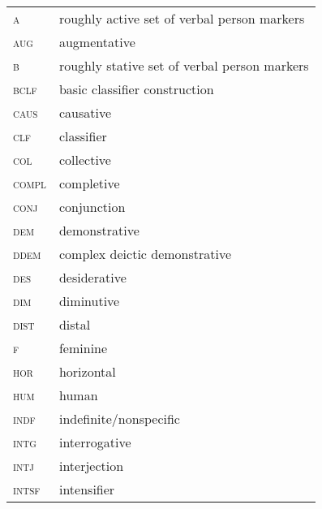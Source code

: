 \documentclass[output=paper,colorlinks,citecolor=brown]{langscibook}
\begin{document}
\begin{tabularx}{.45\textwidth}{lQ}
\textsc{a} & roughly active set of verbal person markers\\
\textsc{aug} & augmentative\\
\textsc{b} & roughly stative set of verbal person markers\\
\textsc{bclf} & basic classifier construction\\
\textsc{caus} & causative\\
\textsc{clf} & classifier\\
\textsc{col} & collective\\
\textsc{compl} & completive\\
\textsc{conj} & conjunction\\
\textsc{dem} & demonstrative\\
\textsc{ddem} & complex deictic demonstrative\\
\textsc{des} & desiderative\\
\textsc{dim} & diminutive\\
\textsc{dist} & distal\\
\textsc{f} & feminine\\
\textsc{hor} & horizontal\\
\textsc{hum} & human\\
\textsc{indf} & indefinite/nonspecific\\
\textsc{intg} & interrogative\\
\textsc{intj} & interjection\\
\textsc{intsf} & intensifier\\
\end{tabularx}
\end{document}
